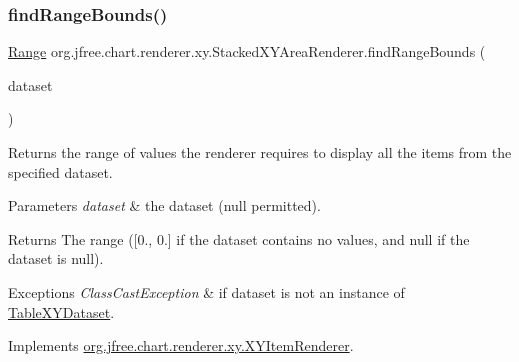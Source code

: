 \subsubsection{\texorpdfstring{find\+Range\+Bounds()}{findRangeBounds()}}
{\footnotesize\ttfamily \mbox{\hyperlink{classorg_1_1jfree_1_1data_1_1_range}{Range}} org.\+jfree.\+chart.\+renderer.\+xy.\+Stacked\+X\+Y\+Area\+Renderer.\+find\+Range\+Bounds (\begin{DoxyParamCaption}\item[{\mbox{\hyperlink{interfaceorg_1_1jfree_1_1data_1_1xy_1_1_x_y_dataset}{X\+Y\+Dataset}}}]{dataset }\end{DoxyParamCaption})}

Returns the range of values the renderer requires to display all the items from the specified dataset.


\begin{DoxyParams}{Parameters}
{\em dataset} & the dataset ({\ttfamily null} permitted).\\
\hline
\end{DoxyParams}
\begin{DoxyReturn}{Returns}
The range (\mbox{[}0., 0.\mbox{]} if the dataset contains no values, and {\ttfamily null} if the dataset is {\ttfamily null}).
\end{DoxyReturn}

\begin{DoxyExceptions}{Exceptions}
{\em Class\+Cast\+Exception} & if {\ttfamily dataset} is not an instance of \mbox{\hyperlink{}{Table\+X\+Y\+Dataset}}. \\
\hline
\end{DoxyExceptions}


Implements \mbox{\hyperlink{interfaceorg_1_1jfree_1_1chart_1_1renderer_1_1xy_1_1_x_y_item_renderer_af9ac6f440e99c73d343de7851e89496a}{org.\+jfree.\+chart.\+renderer.\+xy.\+X\+Y\+Item\+Renderer}}.

\mbox{\label{classorg_1_1jfree_1_1chart_1_1renderer_1_1xy_1_1_stacked_x_y_area_renderer_aebe9cf5b4e1b6f95b2abb9fce060163c}} 
